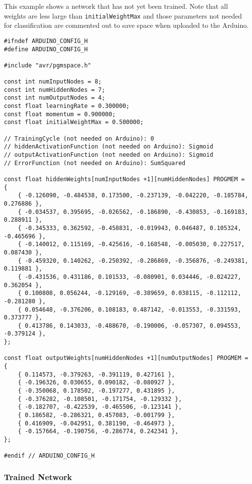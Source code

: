 \documentclass[a4paper]{article}
\begin{document}
This example shows a network that has not yet been trained. Note that all weights are less large than \lstinline{initialWeightMax} and those parameters not needed for classification are commented out to save space when uploaded to the Arduino.

\begin{lstlisting}
#ifndef ARDUINO_CONFIG_H
#define ARDUINO_CONFIG_H

#include "avr/pgmspace.h"

const int numInputNodes = 8;
const int numHiddenNodes = 7;
const int numOutputNodes = 4;
const float learningRate = 0.300000;
const float momentum = 0.900000;
const float initialWeightMax = 0.500000;

// TrainingCycle (not needed on Arduino): 0
// hiddenActivationFunction (not needed on Arduino): Sigmoid
// outputActivationFunction (not needed on Arduino): Sigmoid
// ErrorFunction (not needed on Arduino): SumSquared

const float hiddenWeights[numInputNodes +1][numHiddenNodes] PROGMEM = {
    { -0.126090, -0.484538, 0.173500, -0.237139, -0.042220, -0.185784, 0.276886 }, 
    { -0.034537, 0.395695, -0.026562, -0.186890, -0.430853, -0.169183, 0.288911 }, 
    { -0.345333, 0.362592, -0.458831, -0.019943, 0.046487, 0.105324, -0.465696 }, 
    { -0.140012, 0.115169, -0.425616, -0.168548, -0.005030, 0.227517, 0.087430 }, 
    { -0.459320, 0.140262, -0.250392, -0.286869, -0.356876, -0.249381, 0.119881 }, 
    { -0.431536, 0.431186, 0.101533, -0.080901, 0.034446, -0.024227, 0.362054 }, 
    { 0.100808, 0.056244, -0.129169, -0.389659, 0.038115, -0.112112, -0.281280 }, 
    { 0.054648, -0.376206, 0.108183, 0.487142, -0.013553, -0.331593, 0.373777 }, 
    { 0.413786, 0.143033, -0.488670, -0.190006, -0.057307, 0.094553, -0.379124 }, 
};

const float outputWeights[numHiddenNodes +1][numOutputNodes] PROGMEM = {
    { 0.114573, -0.379263, -0.391119, 0.427161 }, 
    { -0.196326, 0.030655, 0.090182, -0.080927 }, 
    { -0.350068, 0.178502, -0.197277, 0.431895 }, 
    { -0.376282, -0.108501, -0.171754, -0.129332 }, 
    { -0.182707, -0.422539, -0.465506, -0.123141 }, 
    { 0.186582, -0.286321, 0.457083, -0.001799 }, 
    { 0.416909, -0.042951, 0.381190, -0.464973 }, 
    { -0.157664, -0.190756, -0.286774, 0.242341 }, 
};

#endif // ARDUINO_CONFIG_H
\end{lstlisting}

\newpage
\subsubsection{Trained Network}
\end{document}
